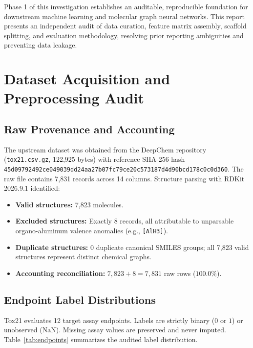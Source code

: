 \documentclass[conference]{IEEEtran}
\begin{document}
Phase 1 of this investigation establishes an auditable, reproducible foundation for downstream machine learning and molecular graph neural networks. This report presents an independent audit of data curation, feature matrix assembly, scaffold splitting, and evaluation methodology, resolving prior reporting ambiguities and preventing data leakage.

\section{Dataset Acquisition and Preprocessing Audit}

\subsection{Raw Provenance and Accounting}
The upstream dataset was obtained from the DeepChem repository (\texttt{tox21.csv.gz}, 122,925 bytes) with reference SHA-256 hash \texttt{45d09792492ce049039dd24aa27b07fc79ce20c573187d4d90bcd178c0c0d360}.
The raw file contains 7,831 records across 14 columns. Structure parsing with RDKit 2026.9.1 identified:
\begin{itemize}
    \item \textbf{Valid structures:} 7,823 molecules.
    \item \textbf{Excluded structures:} Exactly 8 records, all attributable to unparsable organo-aluminum valence anomalies (e.g., \texttt{[AlH3]}).
    \item \textbf{Duplicate structures:} 0 duplicate canonical SMILES groups; all 7,823 valid structures represent distinct chemical graphs.
    \item \textbf{Accounting reconciliation:} $7,823 + 8 = 7,831$ raw rows ($100.0\%$).
\end{itemize}

\subsection{Endpoint Label Distributions}
Tox21 evaluates 12 target assay endpoints. Labels are strictly binary ($0$ or $1$) or unobserved ($\text{NaN}$). Missing assay values are preserved and never imputed. Table~\ref{tab:endpoints} summarizes the audited label distribution.
\end{document}
